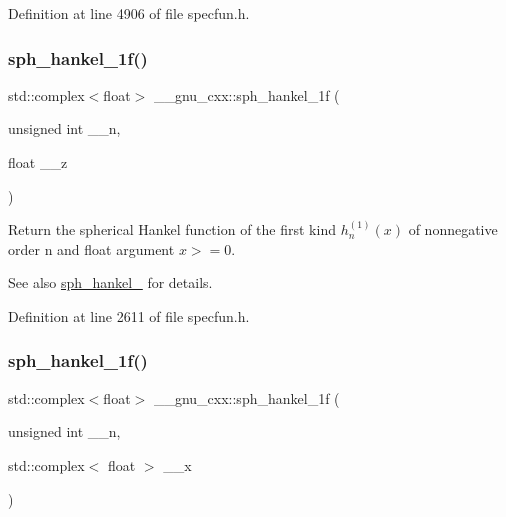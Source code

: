 Definition at line 4906 of file specfun.\+h.

\mbox{\label{group__gnu__math__spec__func_ga70d4fc01069f3f0ac0e3b52fe1dffea4}} 
\subsubsection{\texorpdfstring{sph\+\_\+hankel\+\_\+1f()}{sph\_hankel\_1f()}\hspace{0.1cm}{\footnotesize\ttfamily [1/2]}}
{\footnotesize\ttfamily std\+::complex$<$float$>$ \+\_\+\+\_\+gnu\+\_\+cxx\+::sph\+\_\+hankel\+\_\+1f (\begin{DoxyParamCaption}\item[{unsigned int}]{\+\_\+\+\_\+n,  }\item[{float}]{\+\_\+\+\_\+z }\end{DoxyParamCaption})\hspace{0.3cm}{\ttfamily [inline]}}

Return the spherical Hankel function of the first kind $ h^{(1)}_n(x) $ of nonnegative order n and {\ttfamily float} argument $ x >= 0 $.

\begin{DoxySeeAlso}{See also}
\hyperlink{group__gnu__math__spec__func_ga4424f565fb224ab88b177beb65d08305}{sph\+\_\+hankel\+\_} for details. 
\end{DoxySeeAlso}


Definition at line 2611 of file specfun.\+h.

\mbox{\label{group__gnu__math__spec__func_gadbb875cd50abb62ac75386143486bb2c}} 
\subsubsection{\texorpdfstring{sph\+\_\+hankel\+\_\+1f()}{sph\_hankel\_1f()}\hspace{0.1cm}{\footnotesize\ttfamily [2/2]}}
{\footnotesize\ttfamily std\+::complex$<$float$>$ \+\_\+\+\_\+gnu\+\_\+cxx\+::sph\+\_\+hankel\+\_\+1f (\begin{DoxyParamCaption}\item[{unsigned int}]{\+\_\+\+\_\+n,  }\item[{std\+::complex$<$ float $>$}]{\+\_\+\+\_\+x }\end{DoxyParamCaption})\hspace{0.3cm}{\ttfamily [inline]}}

